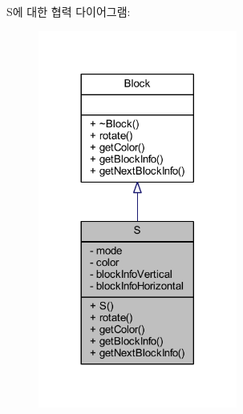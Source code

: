 S에 대한 협력 다이어그램\+:
\nopagebreak
\begin{figure}[H]
\begin{center}
\leavevmode
\includegraphics[width=185pt]{class_s__coll__graph}
\end{center}
\end{figure}
